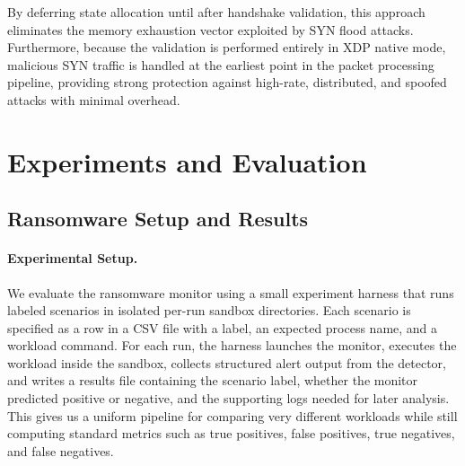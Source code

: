 \documentclass[twocolumn, 10pt]{scrartcl}
\begin{document}
By deferring state allocation until after handshake validation, this approach eliminates the memory exhaustion vector exploited by SYN flood attacks. Furthermore, because the validation is performed entirely in XDP native mode, malicious SYN traffic is handled at the earliest point in the packet processing pipeline, providing strong protection against high-rate, distributed, and spoofed attacks with minimal overhead.

\section{Experiments and Evaluation}

\subsection{Ransomware Setup and Results}
\paragraph{Experimental Setup.}
We evaluate the ransomware monitor using a small experiment harness that runs labeled scenarios in isolated per-run sandbox directories. Each scenario is specified as a row in a CSV file with a label, an expected process name, and a workload command. For each run, the harness launches the monitor, executes the workload inside the sandbox, collects structured alert output from the detector, and writes a results file containing the scenario label, whether the monitor predicted positive or negative, and the supporting logs needed for later analysis. This gives us a uniform pipeline for comparing very different workloads while still computing standard metrics such as true positives, false positives, true negatives, and false negatives.
\end{document}
